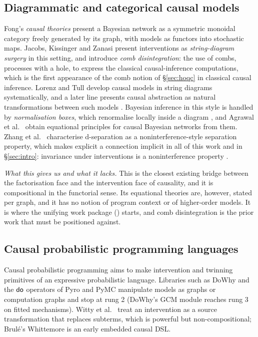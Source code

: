 \subsection{Diagrammatic and categorical causal models}\label{sec:diagrammatic}

Fong's \emph{causal theories} \cite{fong2012causaltheories} present a Bayesian network as a symmetric monoidal category freely generated by its graph, with models as functors into stochastic maps. Jacobs, Kissinger and Zanasi \cite{jacobs2019causal} present interventions as \emph{string-diagram surgery} in this setting, and introduce \emph{comb disintegration}: the use of combs, processes with a hole, to express the classical causal-inference computations, which is the first appearance of the comb notion of \S\ref{sec:hoqc} in classical causal inference. Lorenz and Tull \cite{lorenz2023causalmodelsstringdiagrams} develop causal models in string diagrams systematically, and a later line presents causal abstraction as natural transformations between such models \cite{lorenztull2026abstraction,englberger2025causalabstractionscategoricallyunified}. Bayesian inference in this style is handled by \emph{normalisation boxes}, which renormalise locally inside a diagram \cite{jacobsszelesstein2025inference}, and Agrawal et al.\ \cite{agrawal2026equational} obtain equational principles for causal Bayesian networks from them. Zhang et al.\ \cite{zhang2026semanticseparation} characterise d-separation as a noninterference-style separation property, which makes explicit a connection implicit in all of this work and in \S\ref{sec:intro}: invariance under interventions is a noninterference property \cite{goguen1982noninterference}.

\emph{What this gives us and what it lacks.} This is the closest existing bridge between the factorisation face and the intervention face of causality, and it is compositional in the functorial sense. Its equational theories are, however, stated per graph, and it has no notion of program context or of higher-order models. It is where the unifying work package () starts, and comb disintegration is the prior work that  must be positioned against.

\subsection{Causal probabilistic programming languages}

Causal probabilistic programming aims to make intervention and twinning primitives of an expressive probabilistic language. Libraries such as DoWhy \cite{pywhy,blobaum2024dowhygcm} and the $\mathsf{do}$ operators of Pyro and PyMC \cite{bingham2018pyro,abrilpla2023pymc} manipulate models as graphs or computation graphs and stop at rung 2 (DoWhy's GCM module reaches rung 3 on fitted mechanisms). Witty et al.\ \cite{witty2019synthesis,witty2023bayesian} treat an intervention as a source transformation that replaces subterms, which is powerful but non-compositional; Brulé's Whittemore \cite{brule2018whittemore} is an early embedded causal DSL.

